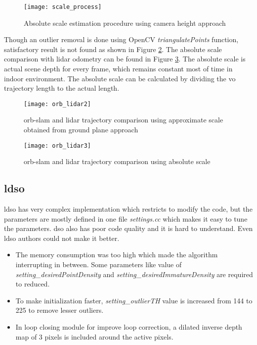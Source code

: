 \begin{figure}[H]
	\centering
	\texttt{[image: scale\_process]}
	\caption{Absolute scale estimation procedure using camera height approach \cite{ground}}
	\label{fig:scale_process}
\end{figure}
\noindent Though an outlier removal is done using OpenCV \textit{triangulatePoints} function, satisfactory result is not found as shown in Figure \ref{fig:orb_lidar2}. The absolute scale comparison with \acrshort{lidar} odometry can be found in Figure \ref{fig:orb_lidar3}. The absolute scale is actual scene depth for every frame, which remains constant most of time in indoor environment. The absolute scale can be calculated by dividing the \acrshort{vo} trajectory length to the actual length. 
\begin{figure}[H]
	\centering
	\texttt{[image: orb\_lidar2]}
	\caption{\acrshort{orb}-\acrshort{slam} and \acrshort{lidar} trajectory comparison using approximate scale obtained from ground plane approach}
	\label{fig:orb_lidar2}
\end{figure}

\begin{figure}[H]
	\centering
	\texttt{[image: orb\_lidar3]}
	\caption{\acrshort{orb}-\acrshort{slam} and \acrshort{lidar} trajectory comparison using absolute scale}
	\label{fig:orb_lidar3}
\end{figure}

\subsection{\acrshort{ldso}}
\acrshort{ldso} has very complex implementation which restricts to modify the code, but the parameters are mostly defined in one file \textit{settings.cc} which makes it easy to tune the parameters. \acrshort{dso} also has poor code quality and it is hard to understand. Even \acrshort{ldso} authors could not make it better. 
\begin{itemize} 
	\item The memory consumption was too high which made the algorithm interrupting in between. Some parameters like value of \textit{setting\_desiredPointDensity} and \textit{setting\_desiredImmatureDensity} are required to reduced.
 	\item To make initialization faster, \textit{setting\_outlierTH} value is increased from 144 to 225 to remove lesser outliers.
	\item In loop closing module for improve loop correction, a dilated inverse depth map of 3 pixels is included around the active pixels. 
\end{itemize}
